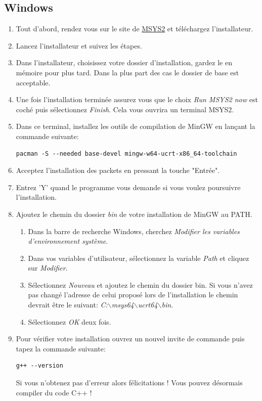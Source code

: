\subsection{Windows}
\begin{enumerate}
	\item Tout d'abord, rendez vous sur le site de \href{https://www.msys2.org/docs/installer/}{MSYS2} et téléchargez l'installateur.
	\item Lancez l'installateur et suivez les étapes.
	\item Dans l'installateur, choisissez votre dossier d'installation, gardez le en mémoire pour plus tard. Dans la plus part des cas le dossier de base est acceptable.
	\item Une fois l'installation terminée assurez vous que le choix \emph{Run MSYS2 now} est coché puis sélectionnez \emph{Finish}. Cela vous ouvrira un terminal MSYS2.
	\item Dans ce terminal, installez les outils de compilation de MinGW en lançant la commande suivante:
		\begin{lstlisting}[xleftmargin=-12em]
			pacman -S --needed base-devel mingw-w64-ucrt-x86_64-toolchain
		\end{lstlisting}
	\item Acceptez l'installation des packets en pressant la touche "Entrée".
	\item Entrez 'Y' quand le programme vous demande si vous voulez poursuivre l'installation.
	\item Ajoutez le chemin du dossier \emph{bin} de votre installation de MinGW au PATH.
		\begin{enumerate}
			\item Dans la barre de recherche Windows, cherchez \emph{Modifier les variables d'environnement système}.
			\item Dans vos variables d'utilisateur, sélectionnez la variable \emph{Path} et cliquez sur \emph{Modifier}.
			\item Sélectionnez \emph{Nouveau} et ajoutez le chemin du dossier bin. Si vous n'avez pas changé l'adresse de celui proposé lors de l'installation le chemin devrait être le suivant: \emph{C:$\backslash$msys64$\backslash$ucrt64$\backslash$bin}.
			\item Sélectionnez \emph{OK} deux fois.
		\end{enumerate}
	\item Pour vérifier votre installation ouvrez un nouvel invite de commande puis tapez la commande suivante:
		\begin{lstlisting}[xleftmargin=-12em]
			g++ --version
		\end{lstlisting}
		Si vous n'obtenez pas d'erreur alors félicitations ! Vous pouvez désormais compiler du code C++ !
\end{enumerate}



